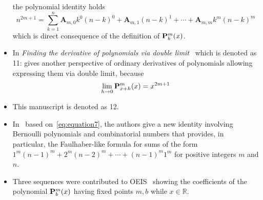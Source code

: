 \begin{itemize}
    the polynomial identity holds
    \[
        n^{2m+1} = \sum_{k=1}^{n} \mathbf{A}_{m,0} k^0 (n-k)^0 + \mathbf{A}_{m,1}(n-k)^1
        + \cdots + \mathbf{A}_{m,m} k^m (n-k)^m
    \]
    which is direct consequence of the definition of ${\mathbf{P}}\sp{m} \sb{b}(x)$.
    \item In \textit{Finding the derivative of polynomials via double limit}~\cite{kolosov_2024_10575485}
    which is denoted as 11: gives another perspective of ordinary derivatives of polynomials allowing expressing
    them via double limit, because
    \begin{align*}
        \lim_{h \to 0} {\mathbf{P}}\sp{m} \sb{x+h}(x) = x^{2m+1}
    \end{align*}
    \item This manuscript is denoted as 12.
    \item In~\cite{barbero2020two} based on~\eqref{eq:equation7}, the authors give a new identity involving
    Bernoulli polynomials and combinatorial numbers that provides,
    in particular, the Faulhaber-like formula for sums of the form $1^m(n-1)^m + 2^m (n -2)^m + \cdots + (n - 1)^m 1^m$
    for positive integers $m$ and $n$.
    \item Three sequences were contributed to
    OEIS~\cite{kolosov2018coefficientspolynomial1, kolosov2018coefficientspolynomial2, kolosov2018coefficientspolynomial3}
    showing the coefficients of the polynomial ${\mathbf{P}}\sp{m} \sb{b}(x)$ having fixed points $m,b$ while $x\in\mathbb{R}$.
\end{itemize}
